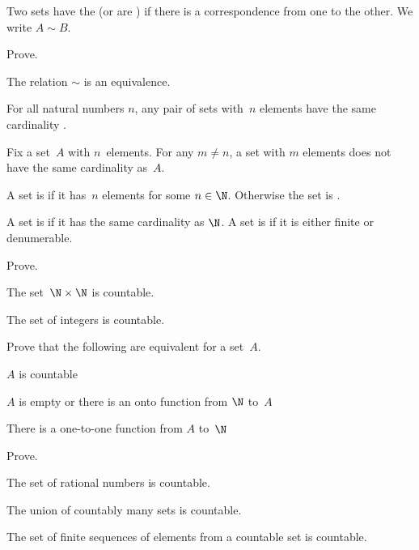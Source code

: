 \documentclass{ibl}
\begin{document}
\begin{df}
Two sets have the  
(or are ) if there is a 
correspondence from one to the other.
We write $A\sim B$.   
\end{df}

\begin{ex} Prove.
\begin{exes}
\item The relation $\sim$ is an equivalence.
\item For all natural numbers $n$, any pair of sets with~$n$ elements
have the same cardinality .
\item Fix a set~$A$ with $n$~elements.
  For any $m\neq n$, a set with $m$ elements does not have the same
  cardinality as~$A$.
\end{exes}
\end{ex}

\begin{df}
A set is  if it has~$n$ elements for some $n\in\N$.
Otherwise the set is .   
\end{df}

\begin{df}
A set is  if it has the same cardinality 
as $\N$.
A set is  if it is either finite or denumerable.
\end{df}

\begin{ex}  Prove.
\begin{exes}
\item The set~$\N\times\N$ is countable.
\item The set of integers is countable.
\end{exes}
\end{ex}

\begin{ex} Prove that the following are equivalent for a set~$A$.
\begin{exes}
\item $A$ is countable
\item $A$ is empty or there is an onto function from $\N$ to~$A$
\item There is a one-to-one function from $A$ to~$\N$    
\end{exes}
\end{ex}

\begin{ex} Prove.
\begin{exes}
\item The set of rational numbers is countable.
\item The union of countably many sets is countable.
\item The set of finite sequences of elements from a countable set is countable.
\end{exes}
\end{ex}
\end{document}
